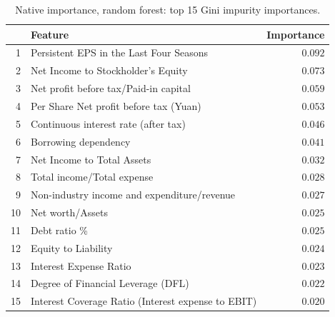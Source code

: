 \begin{table}[htbp]
  \centering
  \caption{Native importance, random forest: top 15 Gini impurity importances.}
  \label{tab:native-rf}
  \small
  \begin{tabular}{rlr}
    \toprule
    & \textbf{Feature} & \textbf{Importance} \\
    \midrule
    1  & Persistent EPS in the Last Four Seasons     & $0.092$ \\
    2  & Net Income to Stockholder's Equity          & $0.073$ \\
    3  & Net profit before tax/Paid-in capital       & $0.059$ \\
    4  & Per Share Net profit before tax (Yuan)      & $0.053$ \\
    5  & Continuous interest rate (after tax)        & $0.046$ \\
    6  & Borrowing dependency                        & $0.041$ \\
    7  & Net Income to Total Assets                  & $0.032$ \\
    8  & Total income/Total expense                  & $0.028$ \\
    9  & Non-industry income and expenditure/revenue & $0.027$ \\
    10 & Net worth/Assets                            & $0.025$ \\
    11 & Debt ratio \%                               & $0.025$ \\
    12 & Equity to Liability                         & $0.024$ \\
    13 & Interest Expense Ratio                      & $0.023$ \\
    14 & Degree of Financial Leverage (DFL)          & $0.022$ \\
    15 & Interest Coverage Ratio (Interest expense to EBIT) & $0.020$ \\
    \bottomrule
  \end{tabular}
\end{table}

